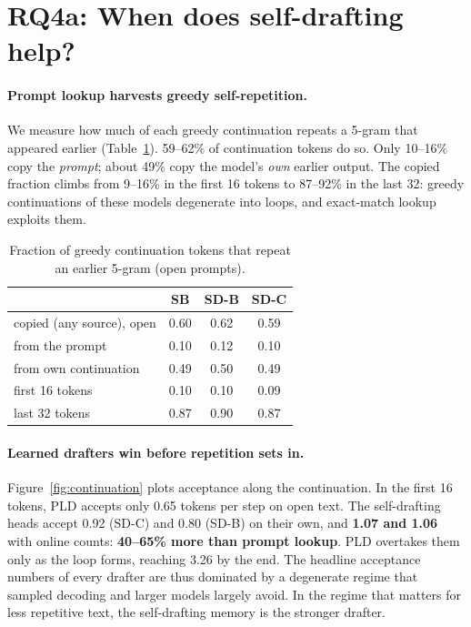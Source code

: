 \documentclass[11pt]{article}
\newcommand{\SB}{\textsc{SB}}
\newcommand{\SDB}{\textsc{SD-B}}
\newcommand{\SDC}{\textsc{SD-C}}
\newcommand{\PLD}{\textsc{PLD}}
\begin{document}
\section{RQ4a: When does self-drafting help?}
\label{sec:when}

\paragraph{Prompt lookup harvests greedy self-repetition.}
We measure how much of each greedy continuation repeats a 5-gram that appeared earlier (Table~\ref{tab:repeat}).
59--62\% of continuation tokens do so. Only 10--16\% copy the \emph{prompt}; about 49\% copy the model's \emph{own} earlier
output. The copied fraction climbs from 9--16\% in the first 16 tokens to 87--92\% in the last 32: greedy continuations of
these models degenerate into loops, and exact-match lookup exploits them.

\begin{table}[t]
\centering
\small
\setlength{\tabcolsep}{3pt}
\begin{tabular}{lccc}
\toprule
 & \SB & \SDB & \SDC \\
\midrule
copied (any source), open & 0.60 & 0.62 & 0.59 \\
\quad from the prompt & 0.10 & 0.12 & 0.10 \\
\quad from own continuation & 0.49 & 0.50 & 0.49 \\
first 16 tokens & 0.10 & 0.10 & 0.09 \\
last 32 tokens & 0.87 & 0.90 & 0.87 \\
\bottomrule
\end{tabular}
\caption{Fraction of greedy continuation tokens that repeat an earlier 5-gram (open prompts).}
\label{tab:repeat}
\end{table}

\paragraph{Learned drafters win before repetition sets in.}
Figure~\ref{fig:continuation} plots acceptance along the continuation. In the first 16 tokens, \PLD{} accepts only 0.65
tokens per step on open text. The self-drafting heads accept 0.92 (\SDC) and 0.80 (\SDB) on their own, and
\textbf{1.07 and 1.06} with online counts: \textbf{40--65\% more than prompt lookup}. \PLD{} overtakes them only as the
loop forms, reaching 3.26 by the end. The headline acceptance numbers of every drafter are thus dominated by a degenerate
regime that sampled decoding and larger models largely avoid. In the regime that matters for less repetitive text, the
self-drafting memory is the stronger drafter.
\end{document}
